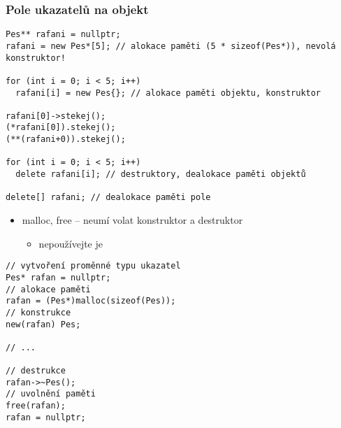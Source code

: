 \begin{frame}[fragile]
\frametitle{Pole ukazatelů na objekt}

\begin{yesblock}

\begin{lstlisting}[basicstyle=\small]
Pes** rafani = nullptr;
rafani = new Pes*[5]; // alokace paměti (5 * sizeof(Pes*)), nevolá konstruktor!

for (int i = 0; i < 5; i++) 
  rafani[i] = new Pes{}; // alokace paměti objektu, konstruktor

rafani[0]->stekej();
(*rafani[0]).stekej();
(**(rafani+0)).stekej();

for (int i = 0; i < 5; i++) 
  delete rafani[i]; // destruktory, dealokace paměti objektů

delete[] rafani; // dealokace paměti pole
\end{lstlisting}
\end{yesblock}
\end{frame}



\begin{frame}[fragile]
\begin{oldblock}
\begin{itemize}
\item malloc, free -- neumí volat konstruktor a destruktor
\begin{itemize}
\item nepoužívejte je
\end{itemize}
\end{itemize}
\end{oldblock}

\begin{deprecatedblock}{}
\begin{lstlisting}[basicstyle={\small},commentstyle={\dcc}]
// vytvoření proměnné typu ukazatel
Pes* rafan = nullptr;
// alokace paměti
rafan = (Pes*)malloc(sizeof(Pes));
// konstrukce
new(rafan) Pes;

// ...

// destrukce
rafan->~Pes();
// uvolnění paměti
free(rafan);
rafan = nullptr;
\end{lstlisting}
\end{deprecatedblock}
\end{frame}




